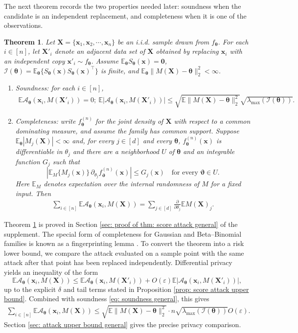 \documentclass[letterpaper,12pt]{article}
\numberwithin{equation}{section}
\theoremstyle{plain}
\newtheorem{Theorem}{Theorem}
\numberwithin{Theorem}{section}
\numberwithin{proposition}{section}
\numberwithin{Lemma}{section}
{
	\theoremstyle{definition}
	\newtheorem{Definition}{Definition}
	\newtheorem{example}{Example}
	\numberwithin{example}{section}
	\newtheorem{fact}{Fact}
	\numberwithin{fact}{section}
	\newtheorem{remark}{Remark}
}
\newcommand{\A}{\mathcal{A}}
\newcommand{\1}{\mathbbm{1}}
\def\bth{{\boldsymbol{\theta}}}
\def\E{\mathbb{E}}
\begin{document}
The next theorem records the two properties needed later: soundness when the candidate is an independent replacement, and completeness when it is one of the observations.
\begin{Theorem}\label{thm: score attack general}
		Let $\bm X = \{\bm x_1, \bm x_2, \cdots, \bm x_n\}$ be an i.i.d. sample drawn from $f_\bth$. For each $i \in [n]$, let $\bm X'_{i}$ denote an adjacent data set of $\bm X$ obtained by replacing $\bm x_i$ with an independent copy $\bm x'_i \sim f_\bth$. Assume $\E_\bth S_\bth(\bm x)=\bm0$, $\mathcal I(\bth)=\E_\bth\{S_\bth(\bm x)S_\bth(\bm x)^\top\}$ is finite, and $\E_\bth\|M(\bm X)-\bth\|_2^2<\infty$.
	\begin{enumerate}
		\item Soundness: for each $i \in [n]$, 
		\begin{align}\label{eq: soundness general}
			\E \A_\bth(\bm x_i, M(\bm X'_i)) = 0; ~ \E |\A_\bth(\bm x_i, M(\bm X'_i))| \leq \sqrt{\E\|M(\bm X) - \bth\|_2^2}\sqrt{\lambda_{\max}(\mathcal I(\bth))}.
		\end{align}
		\item Completeness: write $f_\bth^{(n)}$ for the joint density of $\bm X$ with respect to a common dominating measure, and assume the family has common support. Suppose $\E_\bth|M_j(\bm X)|<\infty$ and, for every $j\in[d]$ and every $\bth$, $f_\bth^{(n)}(\bm x)$ is differentiable in $\theta_j$ and there are a neighborhood $U$ of $\bth$ and an integrable function $G_j$ such that
		\[
		\left|\E_M\{M_j(\bm x)\}\,\partial_{\theta_j}f_{\boldsymbol\vartheta}^{(n)}(\bm x)\right|\leq G_j(\bm x)
		\quad\text{for every }\boldsymbol\vartheta\in U.
		\]
		Here $\E_M$ denotes expectation over the internal randomness of $M$ for a fixed input. Then
		\begin{align}\label{eq: completeness general}
			\sum_{i \in [n]} \E \A_\bth (\bm x_i, M(\bm X)) = \sum_{j \in [d]} \frac{\partial}{\partial \theta_j} \E M(\bm X)_j.
		\end{align}
	\end{enumerate} 
\end{Theorem}
Theorem \ref{thm: score attack general} is proved in Section \ref{sec: proof of thm: score attack general} of the supplement. The special form of completeness for Gaussian and Beta--Binomial families is known as a fingerprinting lemma \citep{tardos2008optimal, bun2014fingerprinting, steinke2017tight, kamath2018privately}. To convert the theorem into a risk lower bound, we compare the attack evaluated on a sample point with the same attack after that point has been replaced independently. Differential privacy yields an inequality of the form
\[
\E \A_\bth (\bm x_i, M(\bm X))
\leq \E \A_\bth (\bm x_i, M(\bm X'_i))
+O(\varepsilon)\E |\A_\bth (\bm x_i, M(\bm X'_i))|,
\]
up to the explicit $\delta$ and tail terms stated in Proposition \ref{prop: score attack upper bound}. Combined with soundness \eqref{eq: soundness general}, this gives
\begin{align*}
	\sum_{i \in [n]} \E \A_\bth (\bm x_i, M(\bm X)) \leq \sqrt{\E\|M(\bm X) - \bth\|_2^2} \cdot n\sqrt{\lambda_{\max}(\mathcal I(\bth))} O(\varepsilon).
\end{align*}
Section \ref{sec: attack upper bound general} gives the precise privacy comparison.
\end{document}
